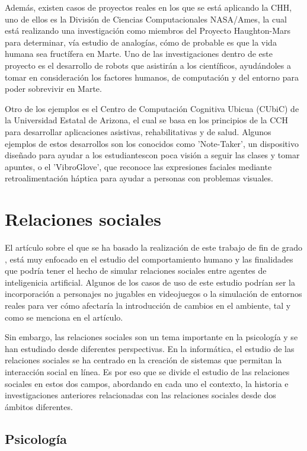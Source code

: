 Además, existen casos de proyectos reales en los que se está aplicando la CHH, uno de ellos es la División de Ciencias Computacionales NASA/Ames, la cual está realizando una investigación como miembros del Proyecto Haughton-Mars para determinar, vía estudio de analogías, cómo de probable es que la vida humana sea fructífera en Marte. Uno de las investigaciones dentro de este proyecto es el desarrollo de robots que asistirán a los científicos, ayudándoles a tomar en consideración los factores humanos, de computación y del entorno para poder sobrevivir en Marte.

Otro de los ejemplos es el Centro de Computación Cognitiva Ubicua (CUbiC) de la Universidad Estatal de Arizona, el cual se basa en los principios de la CCH para desarrollar aplicaciones asistivas, rehabilitativas y de salud. Algunos ejemplos de estos desarrollos son los conocidos como 'Note-Taker', un dispositivo diseñado para ayudar a los estudiantescon poca visión a seguir las clases y tomar apuntes, o el 'VibroGlove', que reconoce las expresiones faciales mediante retroalimentación háptica para ayudar a personas con problemas visuales.

\section{Relaciones sociales}

El artículo sobre el que se ha basado la realización de este trabajo de fin de grado \citep{park2023generative}, está muy enfocado en el estudio del comportamiento humano y las finalidades que podría tener el hecho de simular relaciones sociales entre agentes de inteligenicia artificial. Algunos de los casos de uso de este estudio podrían ser la incorporación a personajes no jugables en videojuegos o la simulación de entornos reales para ver cómo afectaría la introducción de cambios en el ambiente, tal y como se menciona en el artículo.

Sin embargo, las relaciones sociales son un tema importante en la psicología y se han estudiado desde diferentes perspectivas. En la informática, el estudio de las relaciones sociales se ha centrado en la creación de sistemas que permitan la interacción social en línea. Es por eso que se divide el estudio de las relaciones sociales en estos dos campos, abordando en cada uno el contexto, la historia e investigaciones anteriores relacionadas con las relaciones sociales desde dos ámbitos diferentes.

\subsection{Psicología}

